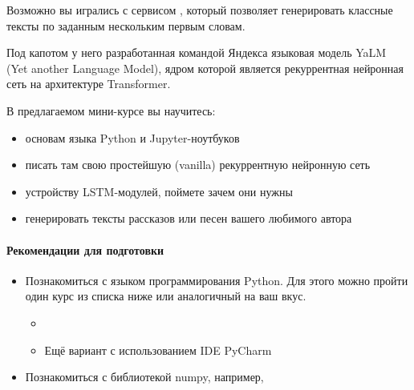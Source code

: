 
Возможно вы игрались с сервисом , который позволяет генерировать классные тексты по заданным нескольким первым словам.

Под капотом у него разработанная командой Яндекса языковая модель YaLM (Yet another Language Model), ядром которой является рекуррентная нейронная сеть на архитектуре Transformer.

В предлагаемом мини-курсе вы научитесь:
\begin{itemize}
\item основам языка Python и Jupyter-ноутбуков
\item писать там свою простейшую (vanilla) рекуррентную нейронную сеть
\item устройству LSTM-модулей, поймете зачем они нужны
\item генерировать тексты рассказов или песен вашего любимого автора
\end{itemize}

\paragraph{Рекомендации для подготовки}
\begin{itemize}
    \item Познакомиться с языком программирования Python. Для этого можно пройти один курс из списка ниже или аналогичный на ваш вкус.
    \begin{itemize}
        \item {}
        \item Ещё вариант  с использованием IDE PyCharm
    \end{itemize}
    \item Познакомиться с библиотекой numpy, например, 
\end{itemize}


